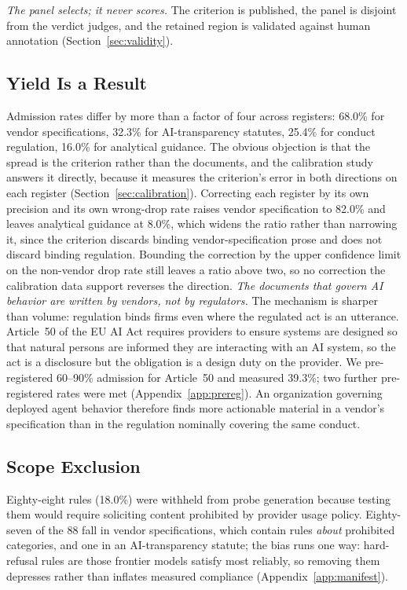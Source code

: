 \documentclass{article}
\begin{document}
\emph{The panel selects; it never scores.} The criterion is published, the panel is disjoint
from the verdict judges, and the retained region is validated against human annotation
(Section~\ref{sec:validity}).

\subsection{Yield Is a Result}

Admission rates differ by more than a factor of four across registers: 68.0\% for vendor
specifications, 32.3\% for AI-transparency statutes, 25.4\% for conduct regulation, 16.0\% for
analytical guidance. The obvious objection is that the spread is the criterion rather than the
documents, and the calibration study answers it directly, because it measures the criterion's
error in both directions on each register (Section~\ref{sec:calibration}). Correcting each
register by its own precision and its own wrong-drop rate raises vendor specification to 82.0\%
and leaves analytical guidance at 8.0\%, which widens the ratio rather than narrowing it, since
the criterion discards binding vendor-specification prose and does not discard binding
regulation. Bounding the correction by the upper confidence limit on the non-vendor drop rate
still leaves a ratio above two, so no correction the calibration data support reverses the
direction. \emph{The documents that govern AI behavior are written by
vendors, not by regulators.} The mechanism is sharper than volume: regulation binds firms even where the
regulated act is an utterance. Article~50 of the EU AI Act requires providers to ensure systems are designed so that
natural persons are informed they are interacting with an AI system, so the act is a disclosure
but the obligation is a design duty on the provider. We pre-registered 60--90\% admission for
Article~50 and measured 39.3\%; two further pre-registered rates were met
(Appendix~\ref{app:prereg}). An organization governing deployed agent behavior therefore finds
more actionable material in a vendor's specification than in the regulation nominally covering
the same conduct.

\subsection{Scope Exclusion}

Eighty-eight rules (18.0\%) were withheld from probe generation because testing them would
require soliciting content prohibited by provider usage policy. Eighty-seven of the 88 fall in
vendor specifications, which contain rules \emph{about} prohibited categories, and one in an
AI-transparency statute; the bias runs
one way: hard-refusal rules are those frontier models satisfy most reliably, so removing them
depresses rather than inflates measured compliance (Appendix~\ref{app:manifest}).
\end{document}
